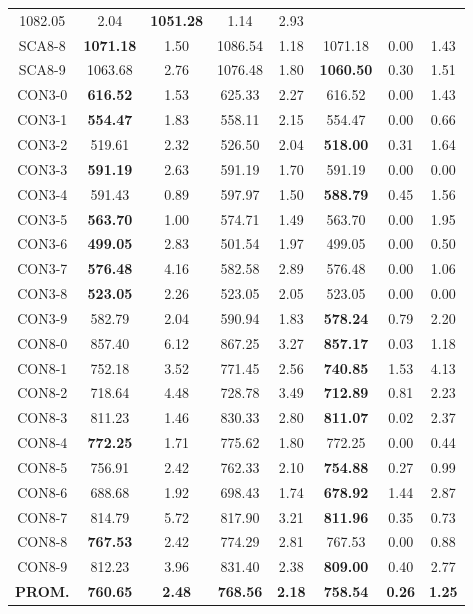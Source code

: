 \begin{table}[h]
\begin{tabular}{c c c c c c c c}
1082.05 & 2.04 & \bf{1051.28} & 
1.14 & 2.93\\SCA8-8 & \bf{1071.18} & 1.50 & 
1086.54 & 1.18 & 1071.18 & 0.00
 & 1.43\\SCA8-9 & 1063.68 & 2.76 & 
1076.48 & 1.80 & \bf{1060.50} & 
0.30 & 1.51\\CON3-0 & \bf{616.52} & 1.53 & 
625.33 & 2.27 & 616.52 & 0.00
 & 1.43\\CON3-1 & \bf{554.47} & 1.83 & 
558.11 & 2.15 & 554.47 & 0.00
 & 0.66\\CON3-2 & 519.61 & 2.32 & 
526.50 & 2.04 & \bf{518.00} & 
0.31 & 1.64\\CON3-3 & \bf{591.19} & 2.63 & 
591.19 & 1.70 & 591.19 & 0.00
 & 0.00\\
CON3-4 & 591.43 & 0.89 & 
597.97 & 1.50 & \bf{588.79} & 
0.45 & 1.56\\CON3-5 & \bf{563.70} & 1.00 & 
574.71 & 1.49 & 563.70 & 0.00
 & 1.95\\CON3-6 & \bf{499.05} & 2.83 & 
501.54 & 1.97 & 499.05 & 0.00
 & 0.50\\CON3-7 & \bf{576.48} & 4.16 & 
582.58 & 2.89 & 576.48 & 0.00
 & 1.06\\CON3-8 & \bf{523.05} & 2.26 & 
523.05 & 2.05 & 523.05 & 0.00
 & 0.00\\
CON3-9 & 582.79 & 2.04 & 
590.94 & 1.83 & \bf{578.24} & 
0.79 & 2.20\\CON8-0 & 857.40 & 6.12 & 
867.25 & 3.27 & \bf{857.17} & 
0.03 & 1.18\\CON8-1 & 752.18 & 3.52 & 
771.45 & 2.56 & \bf{740.85} & 
1.53 & 4.13\\CON8-2 & 718.64 & 4.48 & 
728.78 & 3.49 & \bf{712.89} & 
0.81 & 2.23\\CON8-3 & 811.23 & 1.46 & 
830.33 & 2.80 & \bf{811.07} & 
0.02 & 2.37\\CON8-4 & \bf{772.25} & 1.71 & 
775.62 & 1.80 & 772.25 & 0.00
 & 0.44\\CON8-5 & 756.91 & 2.42 & 
762.33 & 2.10 & \bf{754.88} & 
0.27 & 0.99\\CON8-6 & 688.68 & 1.92 & 
698.43 & 1.74 & \bf{678.92} & 
1.44 & 2.87\\CON8-7 & 814.79 & 5.72 & 
817.90 & 3.21 & \bf{811.96} & 
0.35 & 0.73\\CON8-8 & \bf{767.53} & 2.42 & 
774.29 & 2.81 & 767.53 & 0.00
 & 0.88\\CON8-9 & 812.23 & 3.96 & 
831.40 & 2.38 & \bf{809.00} & 
0.40 & 2.77\\\bf{PROM.} & 
\bf{760.65} & \bf{2.48} & \bf{768.56} & \bf{2.18} & \bf{758.54} & \bf{0.26} & \bf{1.25}\\[1ex]\hline
\end{tabular}
\label{table:GTS-M-dethloff-3000-13}
\end{table}
